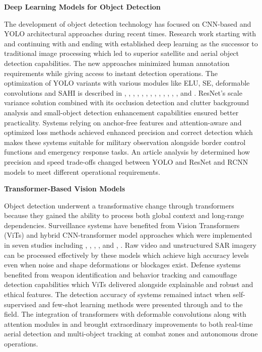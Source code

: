 \documentclass[fleqn,10pt,lineno]{wlpeerj}
\begin{document}
\noindent
\textbf{Deep Learning Models for Object Detection}

\noindent
The development of object detection technology has focused on CNN-based and YOLO architectural approaches during recent times. Research work starting with \cite{6} and continuing with \cite{7} and ending with \cite{8} established deep learning as the successor to traditional image processing which led to superior satellite and aerial object detection capabilities. The new approaches minimized human annotation requirements while giving access to instant detection operations. The optimization of YOLO variants with various modules like ELU, SE, deformable convolutions and SAHI is described in \cite{9}, \cite{10}, \cite{11}, \cite{12}, \cite{13}, \cite{14}, \cite{15}, \cite{16}, \cite{17}, \cite{18}, \cite{19}, \cite{20}, \cite{21}, and \cite{22}. ResNet's scale variance solution combined with its occlusion detection and clutter background analysis and small-object detection enhancement capabilities ensured better practicality. Systems relying on anchor-free features and attention-aware and optimized loss methods achieved enhanced precision and correct detection which makes these systems suitable for military observation alongside border control functions and emergency response tasks. An article analysis by \cite{13} determined how precision and speed trade-offs changed between YOLO and ResNet and RCNN models to meet different operational requirements.
\vspace{1em}

\noindent
\textbf{Transformer-Based Vision Models}

\noindent
Object detection underwent a transformative change through transformers because they gained the ability to process both global context and long-range dependencies. Surveillance systems have benefited from Vision Transformers (ViTs) and hybrid CNN-transformer model approaches which were implemented in seven studies including \cite{5}, \cite{23}, \cite{24}, \cite{25}, \cite{26} and \cite{21}, \cite{17}. Raw video and unstructured SAR imagery can be processed effectively by these models which achieve high accuracy levels even when noise and shape deformations or blockages exist. Defense systems benefited from weapon identification and behavior tracking and camouflage detection capabilities which ViTs delivered alongside explainable and robust and ethical features. The detection accuracy of systems remained intact when self-supervised and few-shot learning methods were presented through \cite{24} and \cite{26} to the field. The integration of transformers with deformable convolutions along with attention modules in \cite{5} and \cite{19} brought extraordinary improvements to both real-time aerial detection and multi-object tracking at combat zones and autonomous drone operations.
\vspace{1em}
\end{document}
